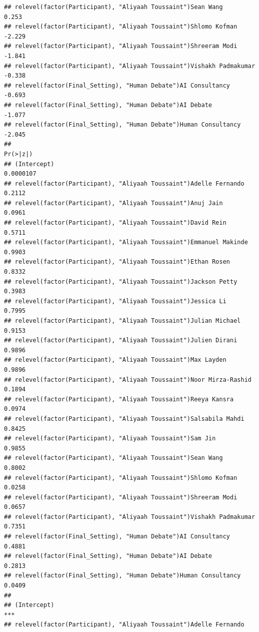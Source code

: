 \documentclass[
]{article}
\begin{document}
\begin{verbatim}
## relevel(factor(Participant), "Aliyaah Toussaint")Sean Wang            0.253
## relevel(factor(Participant), "Aliyaah Toussaint")Shlomo Kofman       -2.229
## relevel(factor(Participant), "Aliyaah Toussaint")Shreeram Modi       -1.841
## relevel(factor(Participant), "Aliyaah Toussaint")Vishakh Padmakumar  -0.338
## relevel(factor(Final_Setting), "Human Debate")AI Consultancy         -0.693
## relevel(factor(Final_Setting), "Human Debate")AI Debate              -1.077
## relevel(factor(Final_Setting), "Human Debate")Human Consultancy      -2.045
##                                                                      Pr(>|z|)
## (Intercept)                                                         0.0000107
## relevel(factor(Participant), "Aliyaah Toussaint")Adelle Fernando       0.2112
## relevel(factor(Participant), "Aliyaah Toussaint")Anuj Jain             0.0961
## relevel(factor(Participant), "Aliyaah Toussaint")David Rein            0.5711
## relevel(factor(Participant), "Aliyaah Toussaint")Emmanuel Makinde      0.9903
## relevel(factor(Participant), "Aliyaah Toussaint")Ethan Rosen           0.8332
## relevel(factor(Participant), "Aliyaah Toussaint")Jackson Petty         0.3983
## relevel(factor(Participant), "Aliyaah Toussaint")Jessica Li            0.7995
## relevel(factor(Participant), "Aliyaah Toussaint")Julian Michael        0.9153
## relevel(factor(Participant), "Aliyaah Toussaint")Julien Dirani         0.9896
## relevel(factor(Participant), "Aliyaah Toussaint")Max Layden            0.9896
## relevel(factor(Participant), "Aliyaah Toussaint")Noor Mirza-Rashid     0.1894
## relevel(factor(Participant), "Aliyaah Toussaint")Reeya Kansra          0.0974
## relevel(factor(Participant), "Aliyaah Toussaint")Salsabila Mahdi       0.8425
## relevel(factor(Participant), "Aliyaah Toussaint")Sam Jin               0.9855
## relevel(factor(Participant), "Aliyaah Toussaint")Sean Wang             0.8002
## relevel(factor(Participant), "Aliyaah Toussaint")Shlomo Kofman         0.0258
## relevel(factor(Participant), "Aliyaah Toussaint")Shreeram Modi         0.0657
## relevel(factor(Participant), "Aliyaah Toussaint")Vishakh Padmakumar    0.7351
## relevel(factor(Final_Setting), "Human Debate")AI Consultancy           0.4881
## relevel(factor(Final_Setting), "Human Debate")AI Debate                0.2813
## relevel(factor(Final_Setting), "Human Debate")Human Consultancy        0.0409
##                                                                        
## (Intercept)                                                         ***
## relevel(factor(Participant), "Aliyaah Toussaint")Adelle Fernando       

\end{verbatim}
\end{document}
